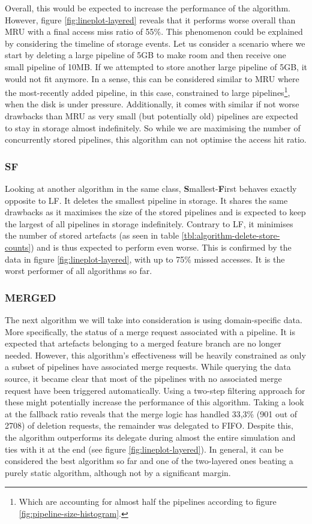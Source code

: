         Overall, this would be expected to increase the performance of the algorithm. However, figure \ref{fig:lineplot-layered} reveals that it performs worse overall than MRU with a final access miss ratio of 55\%. This phenomenon could be explained by considering the timeline of storage events. Let us consider a scenario where we start by deleting a large pipeline of 5GB to make room and then receive one small pipeline of 10MB. If we attempted to store another large pipeline of 5GB, it would not fit anymore. In a sense, this can be considered similar to MRU where the most-recently added pipeline, in this case, constrained to large pipelines\footnote{Which are accounting for almost half the pipelines according to figure \ref{fig:pipeline-size-histogram}.}, when the disk is under pressure. Additionally, it comes with similar if not worse drawbacks than MRU as very small (but potentially old) pipelines are expected to stay in storage almost indefinitely. So while we are maximising the number of concurrently stored pipelines, this algorithm can not optimise the access hit ratio.
    
    \subsubsection{SF}
        Looking at another algorithm in the same class, \textbf{S}mallest-\textbf{F}irst behaves exactly opposite to LF. It deletes the smallest pipeline in storage. It shares the same drawbacks as it maximises the size of the stored pipelines and is expected to keep the largest of all pipelines in storage indefinitely. Contrary to LF, it minimises the number of stored artefacts (as seen in table \ref{tbl:algorithm-delete-store-counts}) and is thus expected to perform even worse. This is confirmed by the data in figure \ref{fig:lineplot-layered}, with up to 75\% missed accesses. It is the worst performer of all algorithms so far. 
        
    \subsubsection{MERGED}\label{sec:algo-merged}
        The next algorithm we will take into consideration is using domain-specific data. More specifically, the status of a merge request associated with a pipeline. It is expected that artefacts belonging to a merged feature branch are no longer needed. However, this algorithm's effectiveness will be heavily constrained as only a subset of pipelines have associated merge requests. While querying the data source, it became clear that most of the pipelines with no associated merge request have been triggered automatically. Using a two-step filtering approach for these might potentially increase the performance of this algorithm. Taking a look at the fallback ratio reveals that the merge logic has handled 33,3\% (901 out of 2708) of deletion requests, the remainder was delegated to FIFO. Despite this, the algorithm outperforms its delegate during almost the entire simulation and ties with it at the end (see figure \ref{fig:lineplot-layered}). In general, it can be considered the best algorithm so far and one of the two-layered ones beating a purely static algorithm, although not by a significant margin.
        

